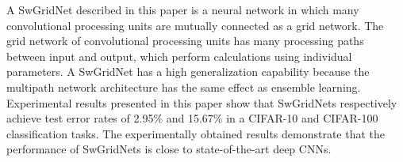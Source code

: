\documentclass[10pt,twocolumn,letterpaper]{article}
\begin{document}
A SwGridNet described in this paper is a neural network in which many convolutional processing units are mutually connected as a grid network.
The grid network of convolutional processing units has many processing paths between input and output, which perform calculations using individual parameters.
A SwGridNet has a high generalization capability because the multipath network architecture has the same effect as ensemble learning.
Experimental results presented in this paper show that SwGridNets respectively achieve test error rates of 2.95\% and 15.67\% in a CIFAR-10 and CIFAR-100 classification tasks.
The experimentally obtained results demonstrate that the performance of SwGridNets is close to state-of-the-art deep CNNs.

{\small

%
%
}
\end{document}
